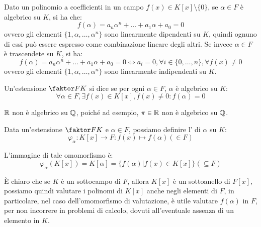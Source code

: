 \documentclass[11pt]{scrartcl}
\begin{document}
\begin{remark}
\label{ec:4.6}
Dato un polinomio a coefficienti in un campo $f(x) \in K[x]\setminus\{0\}$, se $\alpha \in F$ è algebrico su $K$, si ha che:
	\[ f(\alpha) = a_n\alpha^n + \ldots + a_1\alpha + a_0 = 0
	\]
ovvero gli elementi $\{1,\alpha,\ldots,\alpha^n\}$ sono linearmente dipendenti su $K$, quindi ognuno di essi può essere espresso come combinazione lineare degli altri. Se invece $\alpha \in F$ è trascendete su $K$, si ha:
	\[ f(\alpha) = a_n\alpha^n + \ldots + a_1\alpha + a_0 = 0 \iff a_i = 0, \forall i \in \{0,\ldots,n\}, \forall f(x) \ne 0
	\]
ovvero gli elementi $\{1,\alpha,\ldots,\alpha^n\}$ sono linearmente indipendenti su $K$.
\end{remark}

\begin{definition}
Un'estensione $\faktor FK$ si dice  se per ogni $\alpha \in F$, $\alpha$ è algebrico su $K$:
	\[ \forall \alpha \in F, \exists f(x) \in K[x], f(x) \ne 0 : f(\alpha) = 0
	\]
\end{definition}

\begin{example}
$\mathbb R$  non è algebrico su $\mathbb Q$, poiché ad esempio, $\pi \in \mathbb R$ non è algebrico su $\mathbb Q$.
\end{example}

\begin{definition}
Data un'estensione $\faktor FK$ e $\alpha \in F$, possiamo definire l' di $\alpha$ su $K$:
	\[ \varphi_\alpha : K[x] \longrightarrow F : f(x) \longmapsto f(\alpha) (\in F)
	\]
\end{definition}
L'immagine di tale omomorfismo è:
	\[ \varphi_\alpha(K[x]) = K[\alpha] = \{f(\alpha) | f(x) \in K[x]\} (\subseteq F)
	\]

\begin{remark}
È chiaro che se $K$ è un sottocampo di $F$, allora $K[x]$ è un sottoanello di $F[x]$, possiamo quindi valutare i polinomi di $K[x]$ anche negli elementi di $F$, in particolare, nel caso dell'omomorfismo di valutazione, è utile valutare $f(\alpha)$ in $F$, per non incorrere in problemi di calcolo, dovuti all'eventuale assenza di un elemento in $K$.
\end{remark}
\end{document}
